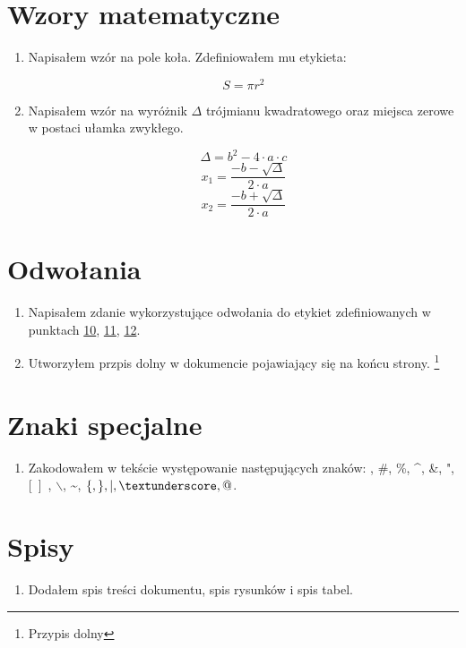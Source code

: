 \documentclass[10pt]{article}
\begin{document}
\section{Wzory matematyczne}
\begin{enumerate}[resume]
\item Napisałem wzór na pole koła. Zdefiniowałem mu etykieta:
\begin{center}
\begin{equation}
S = \pi r^{2}
\end{equation}
\end{center}
\item Napisałem wzór na wyróżnik $\Delta$ trójmianu kwadratowego oraz miejsca zerowe w postaci ułamka zwykłego.
\begin{center}
\begin{equation}
\label{formula}
\Delta = b^{2} - 4\cdot a\cdot c
\end{equation}
\begin{equation}
x_1 = \frac{-b -\sqrt{\Delta}}{2\cdot a}
\end{equation}
\begin{equation}
x_2 = \frac{-b +\sqrt{\Delta}}{2\cdot a}
\end{equation}
\end{center}
\end{enumerate}
\section{Odwołania}
\begin{enumerate}[resume]
\item Napisałem zdanie wykorzystujące odwołania do etykiet zdefiniowanych w punktach \hyperref[ris:da]{10}, \hyperref[tab:da]{11}, \hyperref[formula]{12}.
\item Utworzyłem przpis dolny w dokumencie pojawiający się na końcu strony.
\footnote{Przypis dolny}
\end{enumerate}
\section{Znaki specjalne}
\begin{enumerate}[resume]
\item Zakodowałem w tekście występowanie następujących znaków: \textdollar, \#, \%, \^{}, \&, ", [\, ]\ , $ \backslash $, \~{}, $\lbrace, \rbrace, \mid, \textunderscore, @$.
\end{enumerate}
\section{Spisy}
\begin{enumerate}[resume]
\item Dodałem spis treści dokumentu, spis rysunków i spis tabel.
\end{enumerate}
\end{document}
